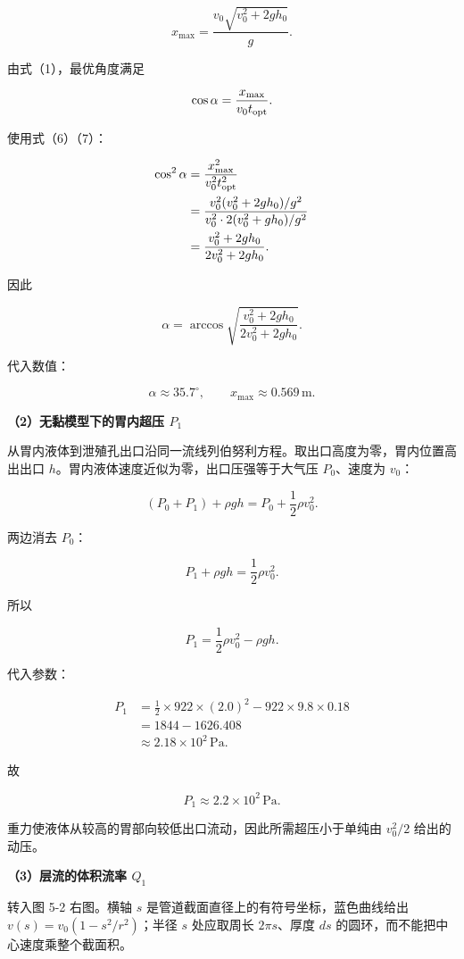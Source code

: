 \documentclass[12pt,a4paper,UTF8]{ctexart}
\begin{document}
\[
\boxed{x_{\max}=\frac{v_0\sqrt{v_0^2+2gh_0}}{g}}.
\tag{7}
\]

由式（1），最优角度满足

\[
\cos\alpha=\frac{x_{\max}}{v_0t_{\rm opt}}.
\]

使用式（6）（7）：

\[
\begin{aligned}
\cos^2\alpha
&=\frac{x_{\max}^2}{v_0^2t_{\rm opt}^2}\\
&=\frac{v_0^2(v_0^2+2gh_0)/g^2}
{v_0^2\cdot2(v_0^2+gh_0)/g^2}\\
&=\frac{v_0^2+2gh_0}{2v_0^2+2gh_0}.
\end{aligned}
\]

因此

\[
\boxed{
\alpha=\arccos\sqrt{\frac{v_0^2+2gh_0}{2v_0^2+2gh_0}}
}.
\tag{8}
\]

代入数值：

\[
\boxed{\alpha\approx35.7^\circ},
\qquad
x_{\max}\approx0.569\,\mathrm m.
\tag{9}
\]

\textbf{（2）无黏模型下的胃内超压 \(P_1\)}

从胃内液体到泄殖孔出口沿同一流线列伯努利方程。取出口高度为零，胃内位置高出出口
\(h\)。胃内液体速度近似为零，出口压强等于大气压 \(P_0\)、速度为
\(v_0\)：

\[
(P_0+P_1)+\rho gh
=P_0+\frac12\rho v_0^2.
\tag{10}
\]

两边消去 \(P_0\)：

\[
P_1+\rho gh=\frac12\rho v_0^2.
\]

所以

\[
\boxed{P_1=\frac12\rho v_0^2-\rho gh}.
\tag{11}
\]

代入参数：

\[
\begin{aligned}
P_1
&=\frac12\times922\times(2.0)^2
-922\times9.8\times0.18\\
&=1844-1626.408\\
&\approx2.18\times10^2\,\mathrm{Pa}.
\end{aligned}
\]

故

\[
\boxed{P_1\approx2.2\times10^2\,\mathrm{Pa}}.
\tag{12}
\]

重力使液体从较高的胃部向较低出口流动，因此所需超压小于单纯由 \(v_0^2/2\)
给出的动压。

\textbf{（3）层流的体积流率 \(Q_1\)}

转入图 5-2 右图。横轴 \(s\) 是管道截面直径上的有符号坐标，蓝色曲线给出
\(v(s)=v_0(1-s^2/r^2)\)；半径 \(s\) 处应取周长 \(2\pi s\)、厚度 \(ds\)
的圆环，而不能把中心速度乘整个截面积。
\end{document}

